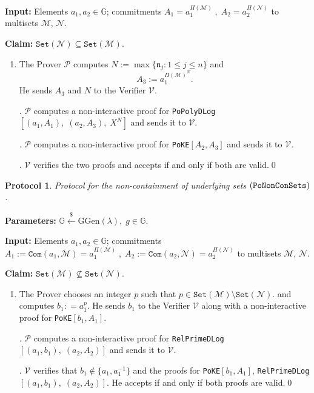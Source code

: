 \documentclass[11pt, lettersize, notitlepage, leqno, footskip=0.6cm]{article}
\newcommand{\ttt}{\texttt}
\newcommand{\sett}{\ttt{Set}}
\newcommand{\mf}{\mathfrak}
\newcommand{\mc}{\mathcal}
\newcommand{\mb}{\mathbb}
\newcommand{\mr}{\mathrm}
\newcommand{\lamb}{\lambda}
\newcommand{\sub}{\subseteq}
\newcommand{\nsub}{\nsubseteq}
\newcommand{\mP}{\mc{P}}
\newcommand{\V}{\mc{V}}
\newcommand{\vs}{\vspace{-0.15cm}}
\newcommand{\noin}{\noindent}
\newtheorem{Prot}[Thm]{Protocol}
\numberwithin{equation}{section}
\begin{document}
\noin \textbf{Input:} Elements $a_1,a_2\in\mb{G}$; commitments $A_1 = a_1^{\Pi(\mc{M})}\;,\;A_2 = a_2^{\Pi(\mc{N})}$ to multisets $\mc{M}$, $\mc{N}$.

\noin \textbf{Claim:} $\sett(\mc{N})\sub \sett(\mc{M})$. \vs

\begin{enumerate}[wide, labelwidth=!, labelindent=0pt] \item The Prover $\mP$ computes $N:= \max\{\mf{n}_j:1\leq j\leq n \}$ and \vs $$A_3:= a_1^{\Pi(\mc{M})^N}.$$ He sends $A_3$ and $N$ to the Verifier $\V$.

\noin 2. $\mP$ computes a non-interactive proof for \verb|PoPolyDLog|$[(a_1, A_1),\;(a_2, A_3),\;X^N]$ and sends it to $\V$.

\noin 3. $\mP$ computes a non-interactive proof for \verb|PoKE|$[A_2,A_3]$ and sends it to $\V$.

\noin 4. $\V$ verifies the two proofs and accepts if and only if both are valid.\qed \end{enumerate}



\begin{Prot} Protocol for the non-containment of underlying sets $(\tt{PoNonConSets})$.\end{Prot}\vspace{-0.3cm}

\noin \textbf{Parameters:} $\mb{G}\xleftarrow{\$} \mr{GGen}(\lamb), \; g\in \mb{G}$. 

\noin \textbf{Input:} Elements $a_1,a_2\in\mb{G}$; commitments $A_1 := \ttt{Com}(a_1, \mc{M}) = a_1^{\Pi(\mc{M})}\;,\;A_2 := \ttt{Com}(a_2, \mc{N})= a_2^{\Pi(\mc{N})}$ to multisets $\mc{M}$, $\mc{N}$.

\noin \textbf{Claim:} $\sett(\mc{M})\nsub \sett(\mc{N})$. \vs

\begin{enumerate}[wide, labelwidth=!, labelindent=0pt] \vs \item The Prover chooses an integer $p$ such that $p\in \sett(\mc{M})\setminus \sett(\mc{N}).$ and computes $b_1: = a_1^p$. He sends $b_1$ to the Verifier $\V$ along with a non-interactive proof for \verb|PoKE|$[b_1, A_1]$.

\noin 2. $\mP$ computes a non-interactive proof for \verb|RelPrimeDLog|$[(a_1, b_1),\; (a_2, A_2)]$ and sends it to $\V$.

\noin 3. $\V$ verifies that $b_1\notin \{ a_1, a_1^{-1}\}$ and the proofs for \verb|PoKE|$[b_1, A_1]$, \verb|RelPrimeDLog|$[(a_1, b_1),\; (a_2, A_2)]$. He accepts if and only if both proofs are valid.\qed \end{enumerate}
\end{document}
